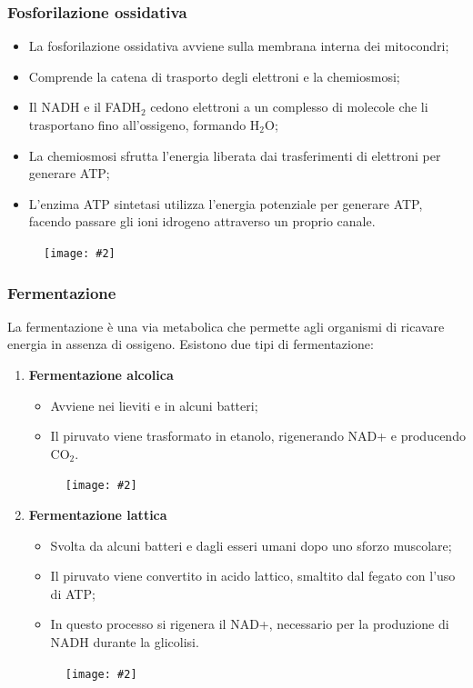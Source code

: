 \documentclass{article}
\newcommand{\cfig}[2]{
    \phantom{}
    \begin{figure}[ht!]
        \begin{center}
            \texttt{[image: \#2]}
        \end{center}
    \end{figure}
}
\begin{document}
\subsubsection{Fosforilazione ossidativa}
\begin{itemize}
    \item La fosforilazione ossidativa avviene sulla membrana interna dei mitocondri;
    \item Comprende la catena di trasporto degli elettroni e la chemiosmosi;
    \item Il NADH e il FADH$_2$ cedono elettroni a un complesso di molecole che li trasportano
        fino all'ossigeno, formando H$_2$O;
    \item La chemiosmosi sfrutta l'energia liberata dai trasferimenti di elettroni per generare
        ATP;
    \item L'enzima ATP sintetasi utilizza l'energia potenziale per generare ATP, facendo
        passare gli ioni idrogeno attraverso un proprio canale.
\end{itemize}
\cfig{.9}{media/fosforilazione-ossidativa.png}

\subsubsection{Fermentazione}
La fermentazione è una via metabolica che permette agli organismi di ricavare energia in
assenza di ossigeno. Esistono due tipi di fermentazione:
\begin{enumerate}
\item \textbf{Fermentazione alcolica}
    \begin{itemize}
        \item Avviene nei lieviti e in alcuni batteri;
        \item Il piruvato viene trasformato in etanolo, rigenerando NAD+ e producendo CO$_2$.
    \end{itemize}
    \cfig{.8}{media/ferm-alcolica.png}
\item \textbf{Fermentazione lattica}
    \begin{itemize}
        \item Svolta da alcuni batteri e dagli esseri umani dopo uno sforzo muscolare;
        \item Il piruvato viene convertito in acido lattico, smaltito dal fegato con l'uso di
            ATP;
        \item In questo processo si rigenera il NAD+, necessario per la produzione di NADH
            durante la glicolisi.
    \end{itemize}
    \newpage
    \cfig{.8}{media/ferm-lattica.png}
\end{enumerate}
\end{document}

